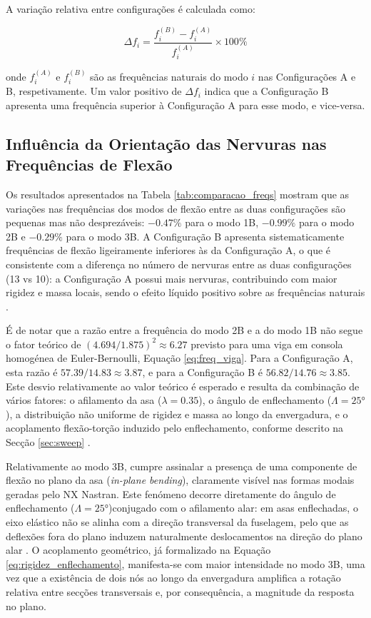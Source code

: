 \documentclass[11pt,oneside,a4paper,final]{report}
\begin{document}
A variação relativa entre configurações é calculada como:

\begin{equation}
    \Delta f_i = \frac{f_i^{(B)} - f_i^{(A)}}{f_i^{(A)}} 
    \times 100\%
    \label{eq:variacao_freq}
\end{equation}

\noindent onde $f_i^{(A)}$ e $f_i^{(B)}$ são as frequências naturais do modo $i$ nas Configurações A e B, respetivamente. Um valor positivo de $\Delta f_i$ indica que a Configuração B apresenta uma frequência superior à Configuração A para esse modo, e vice-versa.

\subsection{Influência da Orientação das Nervuras nas 
Frequências de Flexão}

Os resultados apresentados na Tabela \ref{tab:comparacao_freqs} mostram que as variações nas frequências dos modos de flexão entre as duas configurações são pequenas mas não desprezáveis: $-0.47\%$ para o modo 1B, $-0.99\%$ para o modo 2B e $-0.29\%$ para o modo 3B. A Configuração B apresenta sistematicamente frequências de flexão ligeiramente inferiores às da Configuração A, o que é consistente com a diferença no número de nervuras entre as duas configurações (13 vs 10): a Configuração A possui mais nervuras, contribuindo com maior rigidez e massa locais, sendo o efeito líquido positivo sobre as frequências naturais \cite{Craig2006, Rao2011}.

É de notar que a razão entre a frequência do modo 2B e a do modo 1B não segue o fator teórico de $(4.694/1.875)^2 \approx 6.27$ previsto para uma viga em consola homogénea de Euler-Bernoulli, Equação \eqref{eq:freq_viga}. Para a Configuração A, esta razão é $57.39/14.83 \approx 3.87$, e para a Configuração B é $56.82/14.76 \approx 3.85$. Este desvio relativamente ao valor teórico é esperado e resulta da combinação de vários fatores: o afilamento da asa ($\lambda = 0.35$), o ângulo de enflechamento ($\Lambda = \ang{25}$), a distribuição não uniforme de rigidez e massa ao longo da envergadura, e o acoplamento flexão-torção induzido pelo enflechamento, conforme descrito na Secção \ref{sec:sweep} \cite{Bisplinghoff1996, Wright2015}.

Relativamente ao modo 3B, cumpre assinalar a presença de uma componente de flexão no plano da asa (\textit{in-plane bending}), claramente visível nas formas modais geradas pelo NX Nastran. Este fenómeno decorre diretamente do ângulo de enflechamento ($\Lambda = \ang{25}$)conjugado com o afilamento alar: em asas enflechadas, o eixo elástico não se alinha com a direção transversal da fuselagem, pelo que as deflexões fora do plano induzem naturalmente deslocamentos na direção do plano alar \cite{Hodges2011, Wright2015}. O acoplamento geométrico, já formalizado na Equação \eqref{eq:rigidez_enflechamento}, manifesta-se com maior intensidade no modo 3B, uma vez que a existência de dois nós ao longo da envergadura amplifica a rotação relativa entre secções transversais e, por consequência, a magnitude da resposta no plano.
\end{document}
